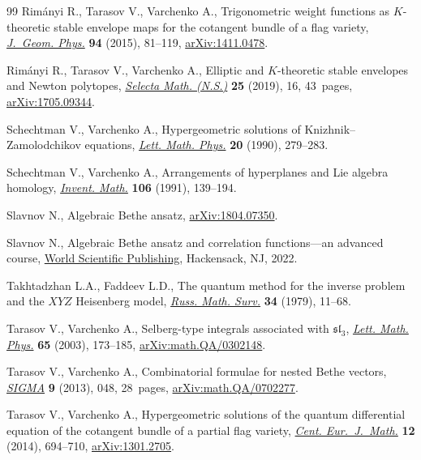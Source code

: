 \documentclass[pdftex]{sigma}
\numberwithin{equation}{section}
\begin{document}
\begin{thebibliography}{99}
Rim\'anyi R., Tarasov V., Varchenko A., Trigonometric weight functions as
 {$K$}-theoretic stable envelope maps for the cotangent bundle of a flag
 variety,
 \href{https://doi.org/10.1016/j.geomphys.2015.04.002}{\textit{J.~Geom.
 Phys.}} \textbf{94} (2015), 81--119,
 \href{http://arxiv.org/abs/1411.0478}{arXiv:1411.0478}.

Rim\'anyi R., Tarasov V., Varchenko A., Elliptic and {$K$}-theoretic stable
 envelopes and {N}ewton polytopes,
 \href{https://doi.org/10.1007/s00029-019-0451-5}{\textit{Selecta Math.
 (N.S.)}} \textbf{25} (2019), 16, 43~pages,
 \href{http://arxiv.org/abs/1705.09344}{arXiv:1705.09344}.

Schechtman V., Varchenko A., Hypergeometric solutions of
 {K}nizhnik--{Z}amolodchikov equations,
 \href{https://doi.org/10.1007/BF00626523}{\textit{Lett. Math. Phys.}}
 \textbf{20} (1990), 279--283.

Schechtman V., Varchenko A., Arrangements of hyperplanes and {L}ie algebra
 homology, \href{https://doi.org/10.1007/BF01243909}{\textit{Invent. Math.}}
 \textbf{106} (1991), 139--194.

Slavnov N., Algebraic {B}ethe ansatz,
 \href{http://arxiv.org/abs/1804.07350}{arXiv:1804.07350}.

Slavnov N., Algebraic {B}ethe ansatz and correlation functions---an advanced
 course, \href{https://doi.org/10.1142/12776}{World Scientific Publishing},
 Hackensack, NJ, 2022.

Takhtadzhan L.A., Faddeev L.D., The quantum method for the inverse problem and
 the {$XYZ$} {H}eisenberg model,
 \href{https://doi.org/10.1070/RM1979v034n05ABEH003909}{\textit{Russ. Math.
 Surv.}} \textbf{34} (1979), 11--68.

Tarasov V., Varchenko A., Selberg-type integrals associated with
 {$\mathfrak{sl}_3$},
 \href{https://doi.org/10.1023/B:MATH.0000010712.67685.9d}{\textit{Lett. Math.
 Phys.}} \textbf{65} (2003), 173--185,
 \href{http://arxiv.org/abs/math.QA/0302148}{arXiv:math.QA/0302148}.

Tarasov V., Varchenko A., Combinatorial formulae for nested {B}ethe vectors,
 \href{https://doi.org/10.3842/SIGMA.2013.048}{\textit{SIGMA}} \textbf{9}
 (2013), 048, 28~pages,
 \href{http://arxiv.org/abs/math.QA/0702277}{arXiv:math.QA/0702277}.

Tarasov V., Varchenko A., Hypergeometric solutions of the quantum differential
 equation of the cotangent bundle of a partial flag variety,
 \href{https://doi.org/10.2478/s11533-013-0376-8}{\textit{Cent.
 Eur.~J.~Math.}} \textbf{12} (2014), 694--710,
 \href{http://arxiv.org/abs/1301.2705}{arXiv:1301.2705}.


\end{thebibliography}
\end{document}

